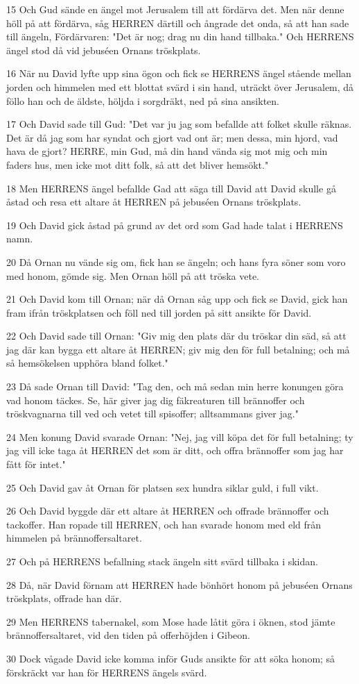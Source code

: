 \par 15 Och Gud sände en ängel mot Jerusalem till att fördärva det. Men när denne höll på att fördärva, såg HERREN därtill och ångrade det onda, så att han sade till ängeln, Fördärvaren: "Det är nog; drag nu din hand tillbaka." Och HERRENS ängel stod då vid jebuséen Ornans tröskplats.
\par 16 När nu David lyfte upp sina ögon och fick se HERRENS ängel stående mellan jorden och himmelen med ett blottat svärd i sin hand, uträckt över Jerusalem, då föllo han och de äldste, höljda i sorgdräkt, ned på sina ansikten.
\par 17 Och David sade till Gud: "Det var ju jag som befallde att folket skulle räknas. Det är då jag som har syndat och gjort vad ont är; men dessa, min hjord, vad hava de gjort? HERRE, min Gud, må din hand vända sig mot mig och min faders hus, men icke mot ditt folk, så att det bliver hemsökt."
\par 18 Men HERRENS ängel befallde Gad att säga till David att David skulle gå åstad och resa ett altare åt HERREN på jebuséen Ornans tröskplats.
\par 19 Och David gick åstad på grund av det ord som Gad hade talat i HERRENS namn.
\par 20 Då Ornan nu vände sig om, fick han se ängeln; och hans fyra söner som voro med honom, gömde sig. Men Ornan höll på att tröska vete.
\par 21 Och David kom till Ornan; när då Ornan såg upp och fick se David, gick han fram ifrån tröskplatsen och föll ned till jorden på sitt ansikte för David.
\par 22 Och David sade till Ornan: "Giv mig den plats där du tröskar din säd, så att jag där kan bygga ett altare åt HERREN; giv mig den för full betalning; och må så hemsökelsen upphöra bland folket."
\par 23 Då sade Ornan till David: "Tag den, och må sedan min herre konungen göra vad honom täckes. Se, här giver jag dig fäkreaturen till brännoffer och tröskvagnarna till ved och vetet till spisoffer; alltsammans giver jag."
\par 24 Men konung David svarade Ornan: "Nej, jag vill köpa det för full betalning; ty jag vill icke taga åt HERREN det som är ditt, och offra brännoffer som jag har fått för intet."
\par 25 Och David gav åt Ornan för platsen sex hundra siklar guld, i full vikt.
\par 26 Och David byggde där ett altare åt HERREN och offrade brännoffer och tackoffer. Han ropade till HERREN, och han svarade honom med eld från himmelen på brännoffersaltaret.
\par 27 Och på HERRENS befallning stack ängeln sitt svärd tillbaka i skidan.
\par 28 Då, när David förnam att HERREN hade bönhört honom på jebuséen Ornans tröskplats, offrade han där.
\par 29 Men HERRENS tabernakel, som Mose hade låtit göra i öknen, stod jämte brännoffersaltaret, vid den tiden på offerhöjden i Gibeon.
\par 30 Dock vågade David icke komma inför Guds ansikte för att söka honom; så förskräckt var han för HERRENS ängels svärd.

